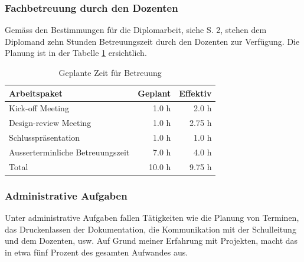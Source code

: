   
  \subsubsection{Fachbetreuung durch den Dozenten}
  
  Gemäss den Bestimmungen für die Diplomarbeit, siehe \cite{hsz_reglement} S. 2,
  stehen dem Diplomand zehn Stunden Betreuungszeit durch den Dozenten zur
  Verfügung. Die Planung ist in der Tabelle \ref{tab:observationPlaning}
  ersichtlich.
  \newline
  
  \begin{table}[htb]
    \sffamily 
    \begin{center}
      \begin{tabular}{p{9cm}rr}
        \toprule
        \textbf{Arbeitspaket} & \textbf{Geplant} & \textbf{Effektiv} \\
        \midrule
        Kick-off Meeting &
        1.0 h &
        2.0 h\\
        Design-review Meeting &
        1.0 h &
        2.75 h\\
        Schlusspräsentation &
        1.0 h &
        1.0 h\\
        Ausserterminliche Betreuungszeit &
        7.0 h &
        4.0 h\\
        \bottomrule
        Total &
        10.0 h &
        9.75 h\\
        \bottomrule
      \end{tabular}
      \caption{Geplante Zeit für Betreuung}
      \label{tab:observationPlaning}
    \end{center}
  \end{table}
  
  \subsubsection{Administrative Aufgaben}
  
  Unter administrative Aufgaben fallen Tätigkeiten wie die Planung von Terminen,
  das Druckenlassen der Dokumentation, die Kommunikation mit der Schulleitung
  und dem Dozenten, usw. Auf Grund meiner Erfahrung mit Projekten, macht das in
  etwa fünf Prozent des gesamten Aufwandes aus.
  \newline
  
